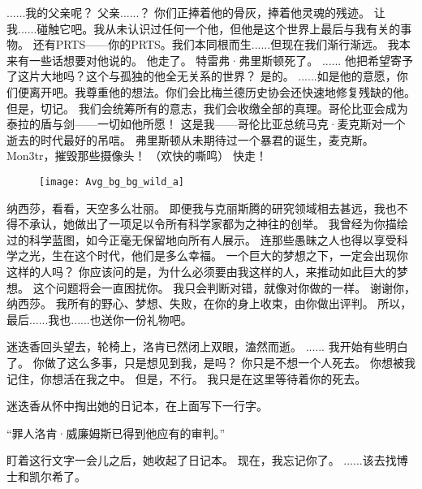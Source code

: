 \documentclass[openany]{book}
\begin{document}
\begin{dialogue}
     ......我的父亲呢？
     父亲......？
     你们正捧着他的骨灰，捧着他灵魂的残迹。
     让我......碰触它吧。我从未认识过任何一个他，但他是这个世界上最后与我有关的事物。
     还有PRTS——你的PRTS。我们本同根而生......但现在我们渐行渐远。
     我本来有一些话想要对他说的。
     他走了。
     特雷弗·弗里斯顿死了。
     ......
     他把希望寄予了这片大地吗？这个与孤独的他全无关系的世界？
     是的。
     ......如是他的意愿，你们便离开吧。我尊重他的想法。你们会比梅兰德历史协会还快速地修复残缺的他。
     但是，切记。
     我们会统筹所有的意志，我们会收缴全部的真理。哥伦比亚会成为泰拉的盾与剑——一切如他所愿！
     这是我——哥伦比亚总统马克·麦克斯对一个逝去的时代最好的吊唁。
     弗里斯顿从未期待过一个暴君的诞生，麦克斯。
     Mon3tr，摧毁那些摄像头！
     （欢快的嘶鸣）
     快走！
\end{dialogue}

\begin{figure}[h]
    \centering
    \texttt{[image: Avg\_bg\_bg\_wild\_a]}
\end{figure}
\begin{dialogue}
     纳西莎，看看，天空多么壮丽。
     即便我与克丽斯腾的研究领域相去甚远，我也不得不承认，她做出了一项足以令所有科学家都为之神往的创举。
     我曾经为你描绘过的科学蓝图，如今正毫无保留地向所有人展示。
     连那些愚昧之人也得以享受科学之光，生在这个时代，他们是多么幸福。
     一个巨大的梦想之下，一定会出现你这样的人吗？
     你应该问的是，为什么必须要由我这样的人，来推动如此巨大的梦想。
     这个问题将会一直困扰你。
     我只会判断对错，就像对你做的一样。
     谢谢你，纳西莎。
     我所有的野心、梦想、失败，在你的身上收束，由你做出评判。
     所以，最后......我也......也送你一份礼物吧。\par
    迷迭香回头望去，轮椅上，洛肯已然闭上双眼，溘然而逝。
     ......
     我开始有些明白了。
     你做了这么多事，只是想见到我，是吗？
     你只是不想一个人死去。
     你想被我记住，你想活在我之中。
     但是，不行。
     我只是在这里等待着你的死去。\par
    迷迭香从怀中掏出她的日记本，在上面写下一行字。\par
    “罪人洛肯·威廉姆斯已得到他应有的审判。”\par
    盯着这行文字一会儿之后，她收起了日记本。
     现在，我忘记你了。
     ......该去找博士和凯尔希了。
\end{dialogue}
\end{document}

